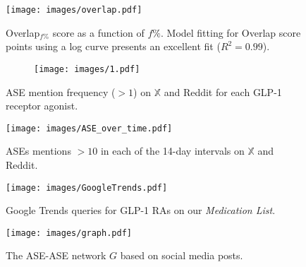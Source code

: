 \documentclass[referee,bst/sn-basic]{sn-jnl}%
\theoremstyle{thmstyletwo}%
\theoremstyle{thmstylethree}%
\begin{document}
\begin{figure}[H]
    \centering
    \texttt{[image: images/overlap.pdf]}
    \caption{Overlap$_{f\%}$ score as a function of ${f\%}$.
    Model fitting for Overlap score points using a log curve presents an excellent fit ($R^2=0.99$).
    }
    \label{fig:overlap}
\end{figure}


\begin{figure}[H]
    \ContinuedFloat
    \centering
    \begin{subfigure}[b]{\textwidth}
        \centering
        \texttt{[image: images/1.pdf]}
        \label{fig:drg_ase_35a}
    \end{subfigure}
    \caption{ASE mention frequency ($>1$) on $\mathbb{X}$ and Reddit for each GLP-1 receptor agonist.}
    \label{fig:drg_ase_35}
\end{figure}



\begin{figure}[H]
    \centering
    \texttt{[image: images/ASE\_over\_time.pdf]}
    \caption{ASEs mentions $> 10$ in each of the 14-day intervals on $\mathbb{X}$ and Reddit. 
    }
    \label{fig:ASE_over_time}
\end{figure} 



\begin{figure}[H]
    \centering
    \texttt{[image: images/GoogleTrends.pdf]}
    \caption{Google Trends queries for GLP-1 RAs on our \textit{Medication List}.
        } 
    \label{fig:Gtrends}
\end{figure} 


 \begin{figure}[H]
    \centering
    \texttt{[image: images/graph.pdf]}
    \caption{The ASE-ASE network $G$ based on social media posts.
    }
    \label{fig:graph}
\end{figure}
\end{document}
